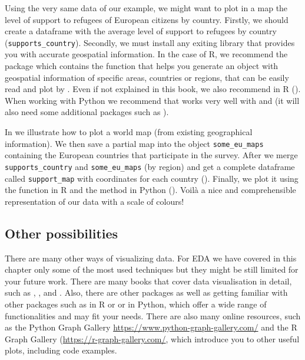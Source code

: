 Using the very same data of our example, we might want to plot in a map the level of support to refugees of European citizens by country. Firstly, we should create a dataframe with the average level of support to refugees by country (\texttt{supports\_country}). Secondly, we must install any exiting library that provides you with accurate geospatial information. In the case of R, we recommend the package  which contains the function  that helps you generate an object with geospatial information of specific areas, countries or regions, that can be easily read and plot by . Even if not explained in this book, we also recommend  in R (\cite{kahle2013ggmap}). When working with Python we recommend  that works very well with  and  (it will also need some additional packages such as ).  

In  we illustrate how to plot a world map (from existing geographical information).
We then save a partial map into the object \texttt{some\_eu\_maps} containing the European countries that participate in the survey. After we merge \texttt{supports\_country} and \texttt{some\_eu\_maps} (by region) and get a complete dataframe called \texttt{support\_map} with coordinates for each country ().  
Finally, we plot it using the  function  in R and the  method  in Python (). Voilà a nice and comprehensible representation of our data with a scale of colours!





\subsection{Other possibilities}

There are many other ways of visualizing data. For EDA we have covered in this chapter only some of the most used techniques but they might be still limited for your future work. There are many books that cover data visualisation in detail, such as \cite{tufte2006beautiful}, \cite{cairo2019charts}, and \cite{Kirk2016}. Also, there are other packages as well as getting familiar with other packages such as  in R or  or  in Python, which offer a wide range of functionalities and may fit your needs. There are also many online resources, such as the Python Graph Gallery \url{https://www.python-graph-gallery.com/} and the R Graph Gallery (\url{https://r-graph-gallery.com/}, which introduce you to other useful plots, including code examples.
